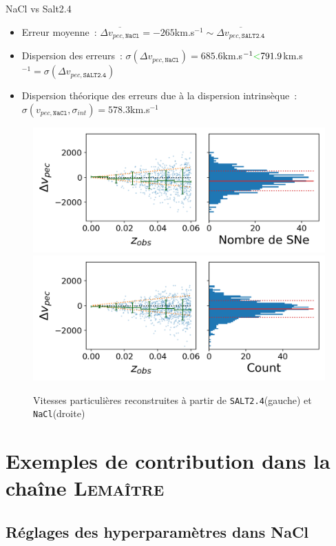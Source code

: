 \documentclass{beamer}
\def\lemaitre{\textsc{Lemaître}\xspace}
\def\nacl{\texttt{NaCl}\xspace}
\def\saltd{\texttt{SALT2.4}\xspace}
\begin{document}
\begin{frame}{NaCl vs Salt2.4}
\begin{itemize}
\item Erreur moyenne~: $\overline{\Delta v_{pec, \nacl}} = -265$km.s$^{-1} \sim \overline{\Delta v_{pec, \saltd}}$
\item Dispersion des erreurs~: $\sigma(\Delta v_{pec, \nacl}) = 685.6$km.s$^{-1} \textcolor{green!80!black}{<}  791.9$km.s$^{-1}=\sigma(\Delta v_{pec, \saltd})$
\item Dispersion théorique des erreurs due à la dispersion intrinsèque~: $\sigma(v_{pec, \nacl}, \sigma_{int}) = 578.3$km.s$^{-1}$
\end{itemize}
\begin{figure}
	\centering
	\includegraphics[width=.48\textwidth, trim = {0 0 0 0}, clip]{figures/vp_salt_clean.png}
	\includegraphics[width=.48\textwidth, trim = {0 0 0 0}, clip]{figures/vp_nacl_clean.png}
	\caption{Vitesses particulières reconstruites à partir de \saltd (gauche) et \nacl (droite)}
\end{figure}
\end{frame}

\section{Exemples de contribution dans la chaîne \lemaitre}

\subsection{Réglages des hyperparamètres dans NaCl}
\end{document}
